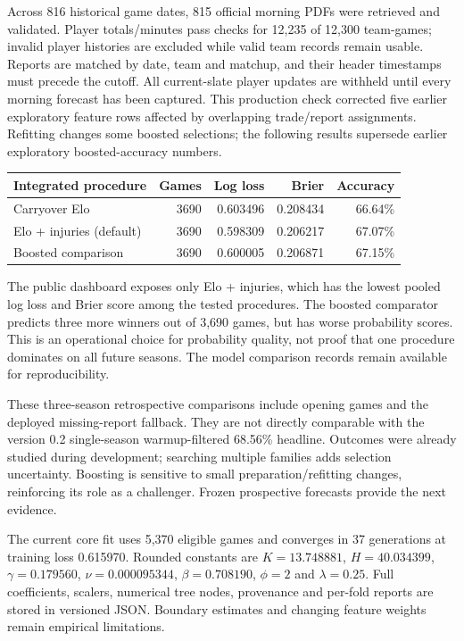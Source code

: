 \documentclass[11pt]{article}
\begin{document}
Across 816 historical game dates, 815 official morning PDFs were retrieved
and validated. Player totals/minutes pass checks for 12,235 of 12,300
team-games; invalid player histories are excluded while valid team records
remain usable. Reports are matched by date, team and matchup, and their
header timestamps must precede the cutoff. All current-slate player updates
are withheld until every morning forecast has been captured. This production
check corrected five earlier exploratory feature rows affected by overlapping
trade/report assignments. Refitting changes some boosted selections; the
following results supersede earlier exploratory boosted-accuracy numbers.

\begin{center}\small
\begin{tabular}{lrrrr}
\toprule
Integrated procedure & Games & Log loss & Brier & Accuracy\\
\midrule
Carryover Elo & 3690 & 0.603496 & 0.208434 & 66.64\%\\
Elo + injuries (default) & 3690 & 0.598309 & 0.206217 & 67.07\%\\
Boosted comparison & 3690 & 0.600005 & 0.206871 & 67.15\%\\
\bottomrule
\end{tabular}
\end{center}
The public dashboard exposes only Elo + injuries, which has the lowest
pooled log loss and Brier score among the tested procedures. The boosted
comparator predicts three more winners out of 3,690 games, but has worse
probability scores. This is an operational choice for probability quality,
not proof that one procedure dominates on all future seasons. The model
comparison records remain available for reproducibility.

These three-season retrospective comparisons include opening games and the
deployed missing-report fallback. They are not directly comparable with the
version 0.2 single-season warmup-filtered 68.56\% headline. Outcomes were
already studied during development; searching multiple families adds
selection uncertainty. Boosting is sensitive to small preparation/refitting
changes, reinforcing its role as a challenger. Frozen prospective forecasts
provide the next evidence.

The current core fit uses 5,370 eligible games and converges in 37
generations at training loss 0.615970. Rounded constants are $K=13.748881$,
$H=40.034399$, $\gamma=0.179560$, $\nu=0.000095344$, $\beta=0.708190$,
$\phi=2$ and $\lambda=0.25$. Full coefficients, scalers, numerical tree
nodes, provenance and per-fold reports are stored in versioned JSON.
Boundary estimates and changing feature weights remain empirical limitations.
\end{document}
